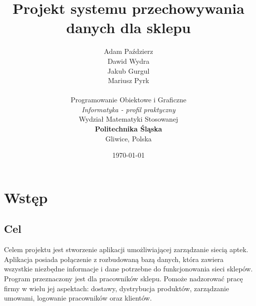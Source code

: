 \documentclass[12pt,a4paper]{article}
\begin{document}
    \pagestyle{fancy}

    \title{
    \vspace*{3cm}
    \textbf{Projekt systemu przechowywania danych dla sklepu}}
    \author{Adam Paździerz\\ Dawid Wydra\\ Jakub Gurgul\\ Mariusz Pyrk\\ 
            \vspace*{0.5cm} \\      
            Programowanie Obiektowe i Graficzne\\
            \textit{Informatyka - profil praktyczny}\\
            Wydział Matematyki Stosowanej\\
            \textbf{Politechnika Śląska}\\
            Gliwice, Polska
    }
    \date{\today}
	
	\maketitle
	\newpage

    \tableofcontents
    \thispagestyle{empty}
    \newpage
\section{Wstęp}

    \subsection{Cel}
        Celem projektu jest stworzenie aplikacji umożliwiającej zarządzanie siecią aptek. Aplikacja posiada połączenie z rozbudowaną bazą danych, która zawiera wszystkie niezbędne informacje i dane potrzebne do funkcjonowania sieci sklepów. Program przeznaczony jest dla pracowników sklepu. Pomoże nadzorować pracę firmy w wielu jej aspektach: dostawy, dystrybucja produktów, zarządzanie umowami, logowanie
            pracowników oraz klientów.
            
\end{document}
